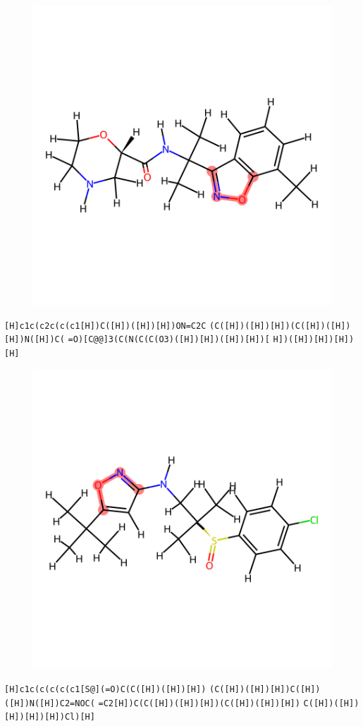 \documentclass{article}
\begin{document}
\begin{figure}[ht]
\centering
    \includegraphics{mol206.png}
\end{figure}
\verb|[H]c1c(c2c(c(c1[H])C([H])([H])[H])ON=C2C| \verb|(C([H])([H])[H])(C([H])([H])[H])N([H])C(| \verb|=O)[C@@]3(C(N(C(C(O3)([H])[H])([H])[H])[| \verb|H])([H])[H])[H])[H]|

\begin{figure}[ht]
\centering
    \includegraphics{mol207.png}
\end{figure}
\verb|[H]c1c(c(c(c(c1[S@](=O)C(C([H])([H])[H])| \verb|(C([H])([H])[H])C([H])([H])N([H])C2=NOC(| \verb|=C2[H])C(C([H])([H])[H])(C([H])([H])[H])| \verb|C([H])([H])[H])[H])[H])Cl)[H]|
\end{document}
